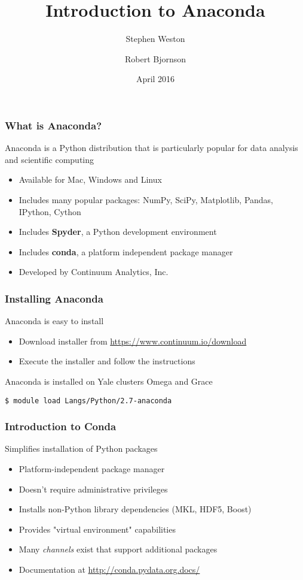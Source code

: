 \documentclass[10pt]{beamer}
\title{Introduction to Anaconda}
\author{{Stephen Weston} \and {Robert Bjornson}}
\institute[Yale]{
  Yale Center for Research Computing \\
  Yale University
}
\date{April 2016}
\begin{document}
\begin{frame}[plain]
  \titlepage
\end{frame}

\begin{frame}
\frametitle{What is Anaconda?}
Anaconda is a Python distribution that is particularly popular
for data analysis and scientific computing
\begin{itemize}
\item Available for Mac, Windows and Linux
\item Includes many popular packages:
  NumPy, SciPy, Matplotlib, Pandas, IPython, Cython
\item Includes \textbf{Spyder}, a Python development environment
\item Includes \textbf{conda}, a platform independent package manager
\item Developed by Continuum Analytics, Inc.
\end{itemize}
\end{frame}

\begin{frame}[fragile]
\frametitle{Installing Anaconda}
Anaconda is easy to install
\begin{itemize}
\item Download installer from \url{https://www.continuum.io/download}
\item Execute the installer and follow the instructions
\end{itemize}
\vskip10pt
Anaconda is installed on Yale clusters Omega and Grace
\begin{verbatim}
$ module load Langs/Python/2.7-anaconda
\end{verbatim}
\end{frame}

\begin{frame}
\frametitle{Introduction to Conda}
Simplifies installation of Python packages
\begin{itemize}
\item Platform-independent package manager
\item Doesn't require administrative privileges
\item Installs non-Python library dependencies (MKL, HDF5, Boost)
\item Provides "virtual environment" capabilities
\item Many \textit{channels} exist that support additional packages
\item Documentation at \url{http://conda.pydata.org.docs/}
\end{itemize}
\end{frame}
\end{document}
